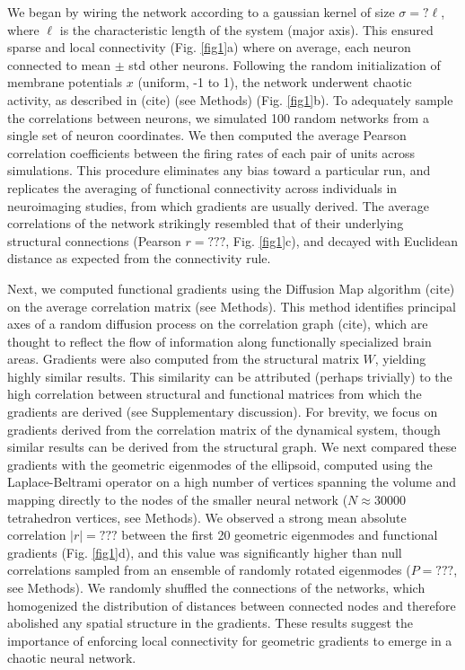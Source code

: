 \documentclass{article}
\begin{document}
\begin{multicols}{2}
We began by wiring the network according to a gaussian kernel of size $\sigma=?\ell$, where $\ell$ is the characteristic length of the system (major axis). This ensured sparse and local connectivity (Fig. \ref{fig1}a) where on average, each neuron connected to mean $\pm$ std other neurons. Following the random initialization of membrane potentials $x$ (uniform, -1 to 1), the network underwent chaotic activity, as described in (cite) (see Methods) (Fig. \ref{fig1}b). To adequately sample the correlations between neurons, we simulated 100 random networks from a single set of neuron coordinates. We then computed the average Pearson correlation coefficients between the firing rates of each pair of units across simulations. This procedure eliminates any bias toward a particular run, and replicates the averaging of functional connectivity across individuals in neuroimaging studies, from which gradients are usually derived. The average correlations of the network strikingly resembled that of their underlying structural connections (Pearson $r=???$, Fig. \ref{fig1}c), and decayed with Euclidean distance as expected from the connectivity rule.

Next, we computed functional gradients using the Diffusion Map algorithm (cite) on the average correlation matrix (see Methods). This method identifies principal axes of a random diffusion process on the correlation graph (cite), which are thought to reflect the flow of information along functionally specialized brain areas. Gradients were also computed from the structural matrix $W$, yielding highly similar results. This similarity can be attributed (perhaps trivially) to the high correlation between structural and functional matrices from which the gradients are derived (see Supplementary discussion). For brevity, we focus on gradients derived from the correlation matrix of the dynamical system, though similar results can be derived from the structural graph. We next compared these gradients with the geometric eigenmodes of the ellipsoid, computed using the Laplace-Beltrami operator on a high number of vertices spanning the volume and mapping directly to the nodes of the smaller neural network ($N\approx30000$ tetrahedron vertices, see Methods). We observed a strong mean absolute correlation $|r|=???$ between the first 20 geometric eigenmodes and functional gradients (Fig. \ref{fig1}d), and this value was significantly higher than null correlations sampled from an ensemble of randomly rotated eigenmodes ($P=???$, see Methods). We randomly shuffled the connections of the networks, which homogenized the distribution of distances between connected nodes and therefore abolished any spatial structure in the gradients. These results suggest the importance of enforcing local connectivity for geometric gradients to emerge in a chaotic neural network. 



\end{multicols}
\end{document}

